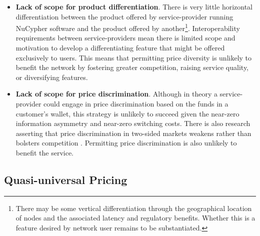 \documentclass[longbibliography,nofootinbib]{revtex4-1}
\begin{document}
\begin{itemize}
    \item \textbf{Lack of scope for product differentiation}. There is very little horizontal differentiation between the product offered by service-provider running NuCypher software and the product offered by another\footnote{There may be some vertical differentiation through the geographical location of nodes and the associated latency and regulatory benefits. Whether this is a feature desired by network user remains to be substantiated.}. Interoperability requirements between service-providers mean there is limited scope and motivation to develop a differentiating feature that might be offered exclusively to users. This means that permitting price diversity is unlikely to benefit the network by fostering greater competition, raising service quality, or diversifying features. 
    \item \textbf{Lack of scope for price discrimination}. Although in theory a service-provider could engage in price discrimination based on the funds in a customer’s wallet, this strategy is unlikely to succeed given the near-zero information asymmetry and near-zero switching costs. There is also research asserting that price discrimination in two-sided markets weakens rather than bolsters competition \cite{discrim}. Permitting price discrimination is also unlikely to benefit the service.
\end{itemize}

\subsection{Quasi-universal Pricing} \label{qup}
\end{document}
